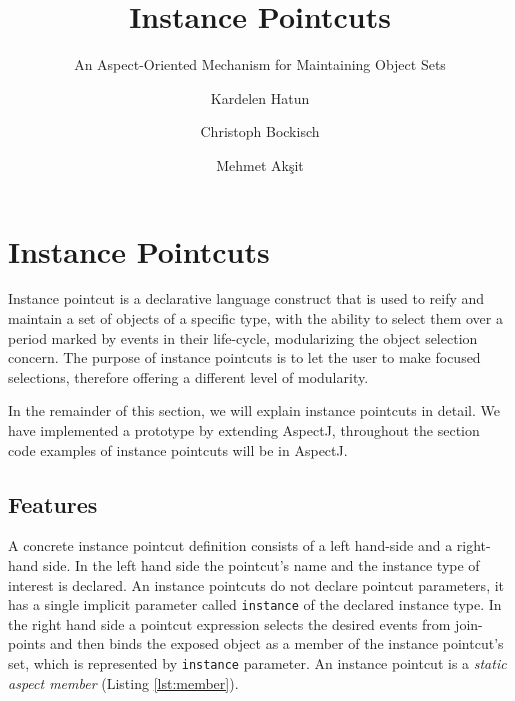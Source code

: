 \documentclass{llncs}
\begin{document}
\title{Instance Pointcuts}
\subtitle{An Aspect-Oriented Mechanism for Maintaining Object Sets}

\author{Kardelen Hatun \and Christoph Bockisch \and Mehmet Ak\c{s}it}




\section{Instance Pointcuts}
Instance pointcut is a declarative language construct that is used to reify and maintain a set of objects of a specific type, with the ability to select them over a period marked by events in their life-cycle, modularizing the object selection concern. The purpose of instance pointcuts is to  let the user to make focused selections, therefore offering a different level of modularity. 
 
In the remainder of this section, we will explain instance pointcuts in detail. We have implemented a prototype by extending AspectJ, throughout the section code examples of instance pointcuts will be in AspectJ.


\subsection{Features}

A concrete instance pointcut definition consists of a left hand-side and a right-hand side. 
In the left hand side the pointcut's name and the instance type of interest is declared. 
An instance pointcuts do not declare pointcut parameters, it has a single implicit parameter called \texttt{instance} of the declared instance type. 
In the right hand side a pointcut expression selects the desired events from join-points and then binds the exposed object as a member of the instance pointcut's set, which is represented by \texttt{instance} parameter. 
An instance pointcut is a \emph{static aspect member} (Listing \ref{lst:member}).%
\end{document}
